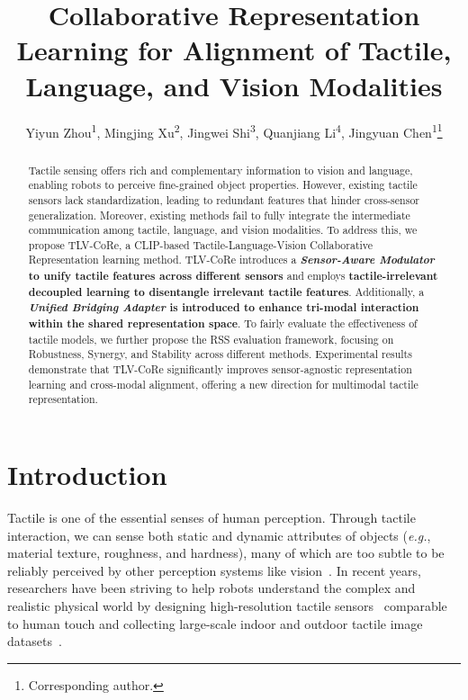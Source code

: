 \documentclass[letterpaper]{article} %
\title{Collaborative Representation Learning for Alignment of Tactile, Language, and Vision Modalities}
\author {
    Yiyun Zhou\textsuperscript{\rm 1}\equalcontrib,
    Mingjing Xu\textsuperscript{\rm 2}\equalcontrib,
    Jingwei Shi\textsuperscript{\rm 3}\equalcontrib,
    Quanjiang Li\textsuperscript{\rm 4},
    Jingyuan Chen\textsuperscript{\rm 1}\thanks{Corresponding author.}
}
\theoremstyle{definition}                %
\theoremstyle{plain}                     %
\theoremstyle{remark}                    %
\begin{document}
\maketitle

\begin{abstract}


Tactile sensing offers rich and complementary information to vision and language, enabling robots to perceive fine-grained object properties. However, existing tactile sensors lack standardization, leading to redundant features that hinder cross-sensor generalization. Moreover, existing methods fail to fully integrate the intermediate communication among tactile, language, and vision modalities. To address this, we propose TLV-CoRe, a CLIP-based Tactile-Language-Vision Collaborative Representation learning method. TLV-CoRe introduces a \textbf{\textit{Sensor-Aware Modulator} to unify tactile features across different sensors} and employs \textbf{tactile-irrelevant decoupled learning to disentangle irrelevant tactile features}. Additionally, a \textbf{\textit{Unified Bridging Adapter} is introduced to enhance tri-modal interaction within the shared representation space}. To fairly evaluate the effectiveness of tactile models, we further propose the RSS evaluation framework, focusing on Robustness, Synergy, and Stability across different methods. Experimental results demonstrate that TLV-CoRe significantly improves sensor-agnostic representation learning and cross-modal alignment, offering a new direction for multimodal tactile representation.

\end{abstract}

\section{Introduction}
\label{sec:introduction}



Tactile is one of the essential senses of human perception. Through tactile interaction, we can sense both static and dynamic attributes of objects (\textit{e.g.}, material texture, roughness, and hardness), many of which are too subtle to be reliably perceived by other perception systems like vision~\cite{cheng2025touch100k, shi2025presentagent, dave2024multimodal, li2025madakv, li2025flowmm, lv2025out, jiang2025acckv, jiang2025arnet}. In recent years, researchers have been striving to help robots understand the complex and realistic physical world by designing high-resolution tactile sensors~\cite{yuan2017gelsight, donlon2018gelslim, lambeta2020digit, zhang2024compact} comparable to human touch and collecting large-scale indoor and outdoor tactile image datasets~\cite{yang2022touch, kerr2022self, fu2024tou, yu2024octopi, feng2025anytouch}.
\end{document}
